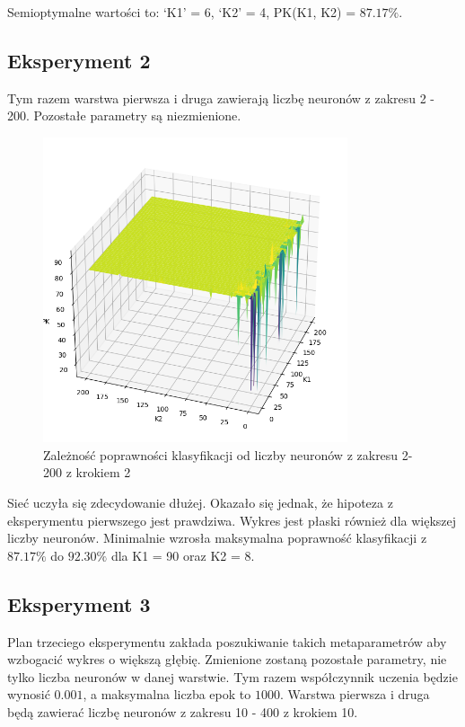 \documentclass{article}
\begin{document}
Semioptymalne wartości to: `K1' = 6, `K2' = 4, PK(K1, K2) = $87.17\%$.

\subsection{Eksperyment 2}
Tym razem warstwa pierwsza i druga zawierają liczbę neuronów z zakresu 2 - 200.
Pozostałe parametry są niezmienione.

\begin{figure}[H]
    \centering
    \includegraphics[width=0.8\textwidth, keepaspectratio]{k1_k2_2.png}
    \caption{Zależność poprawności klasyfikacji od liczby neuronów z zakresu 2-200 z krokiem 2}
    \label{fig:k1k2_2}
\end{figure}

Sieć uczyła się zdecydowanie dłużej.
Okazało się jednak, że hipoteza z eksperymentu pierwszego jest prawdziwa.
Wykres jest płaski również dla większej liczby neuronów.
Minimalnie wzrosła maksymalna poprawność klasyfikacji z $87.17\%$ do $92.30\%$ dla K1 = 90 oraz K2 = 8.

\subsection{Eksperyment 3}
Plan trzeciego eksperymentu zakłada poszukiwanie takich metaparametrów aby wzbogacić wykres o większą głębię.
Zmienione zostaną pozostałe parametry, nie tylko liczba neuronów w danej warstwie.
Tym razem współczynnik uczenia będzie wynosić $0.001$, a maksymalna liczba epok to $1000$.
Warstwa pierwsza i druga będą zawierać liczbę neuronów z zakresu 10 - 400 z krokiem 10.
\end{document}
